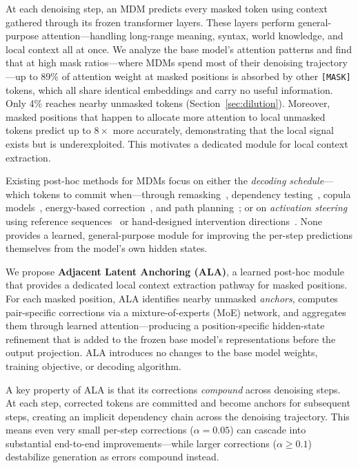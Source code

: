 \documentclass{article} %
\begin{document}
At each denoising step, an MDM predicts every masked token using context gathered through its frozen transformer layers.
These layers perform general-purpose attention---handling long-range meaning, syntax, world knowledge, and local context all at once.
We analyze the base model's attention patterns and find that at high mask ratios---where MDMs spend most of their denoising trajectory---up to 89\% of attention weight at masked positions is absorbed by other \texttt{[MASK]} tokens, which all share identical embeddings and carry no useful information.
Only 4\% reaches nearby unmasked tokens (Section~\ref{sec:dilution}).
Moreover, masked positions that happen to allocate more attention to local unmasked tokens predict up to $8\times$ more accurately, demonstrating that the local signal exists but is underexploited.
This motivates a dedicated module for local context extraction.

Existing post-hoc methods for MDMs focus on either the \emph{decoding schedule}---which tokens to commit when---through remasking~\citep{shi2025remdm}, dependency testing~\citep{chen2025punt}, copula models~\citep{nisonoff2025copula}, energy-based correction~\citep{sun2025edlm}, and path planning~\citep{gat2025p2}; or on \emph{activation steering} using reference sequences~\citep{wang2026ilrr} or hand-designed intervention directions~\citep{turner2024steering, li2023iti}.
None provides a learned, general-purpose module for improving the per-step predictions themselves from the model's own hidden states.

We propose \textbf{Adjacent Latent Anchoring (ALA)}, a learned post-hoc module that provides a dedicated local context extraction pathway for masked positions.
For each masked position, ALA identifies nearby unmasked \emph{anchors}, computes pair-specific corrections via a mixture-of-experts (MoE) network, and aggregates them through learned attention---producing a position-specific hidden-state refinement that is added to the frozen base model's representations before the output projection.
ALA introduces no changes to the base model weights, training objective, or decoding algorithm.

A key property of ALA is that its corrections \emph{compound} across denoising steps.
At each step, corrected tokens are committed and become anchors for subsequent steps, creating an implicit dependency chain across the denoising trajectory.
This means even very small per-step corrections ($\alpha{=}0.05$) can cascade into substantial end-to-end improvements---while larger corrections ($\alpha{\geq}0.1$) destabilize generation as errors compound instead.
\end{document}
